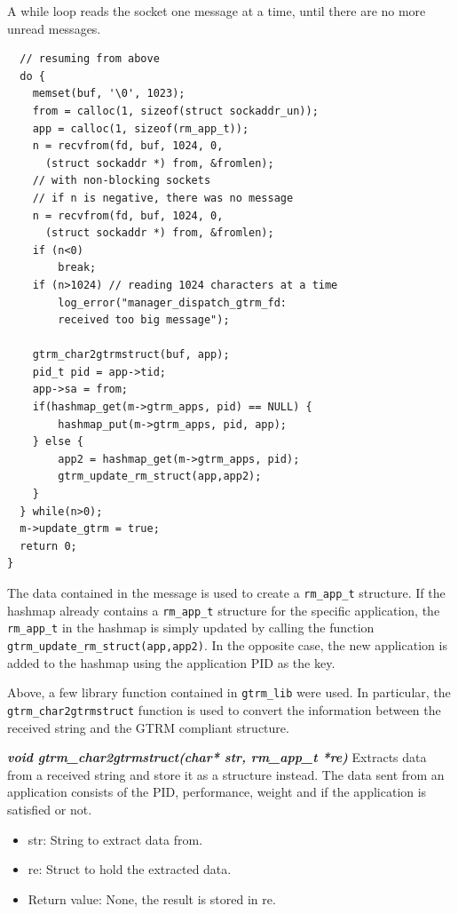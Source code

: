 \documentclass[nobiblatex]{LTHthesis}
\begin{document}
A while loop reads the socket one message at a time, until there are no 
more unread messages. 

\begin{lstlisting}
  // resuming from above
  do {		
  	memset(buf, '\0', 1023);
  	from = calloc(1, sizeof(struct sockaddr_un));
  	app = calloc(1, sizeof(rm_app_t));	
  	n = recvfrom(fd, buf, 1024, 0, 
      (struct sockaddr *) from, &fromlen);
    // with non-blocking sockets
  	// if n is negative, there was no message
  	n = recvfrom(fd, buf, 1024, 0, 
      (struct sockaddr *) from, &fromlen);
  	if (n<0)
  		break;
  	if (n>1024) // reading 1024 characters at a time
  		log_error("manager_dispatch_gtrm_fd:
        received too big message");

  	gtrm_char2gtrmstruct(buf, app);
  	pid_t pid = app->tid;
  	app->sa = from;
  	if(hashmap_get(m->gtrm_apps, pid) == NULL) {
  		hashmap_put(m->gtrm_apps, pid, app);
  	} else {
  		app2 = hashmap_get(m->gtrm_apps, pid);
  		gtrm_update_rm_struct(app,app2);
  	}															
  } while(n>0);
  m->update_gtrm = true;
  return 0;
}
\end{lstlisting}

The data contained in the message is used to create a \texttt{rm\_app\_t}
structure. If the hashmap already contains a \texttt{rm\_app\_t} structure 
for the specific application, the \texttt{rm\_app\_t} in the hashmap is
simply updated by calling the function 
\texttt{gtrm\_update\_rm\_struct(app,app2)}. In the opposite case, the new
application is added to the hashmap using the application PID as the key.

Above, a few library function contained in \texttt{gtrm\_lib} were used.
In particular, the \texttt{gtrm\_char2gtrmstruct} function is used to
convert the information between the received string and the GTRM
compliant structure.
\begin{framed}
	\begin{flushleft}
		\textbf{\emph{void gtrm\_char2gtrmstruct(char* str, rm\_app\_t *re)}}
		Extracts data from a received string and store it as a structure 
    instead. The data sent from an application consists of the PID,
    performance, weight and if the application is satisfied or not.
		\begin{itemize} 
		\item str: String to extract data from.
		\item re: Struct to hold the extracted data.
		\item Return value: None, the result is stored in re.
		\end{itemize}
	\end{flushleft}	
\end{framed}
\end{document}
